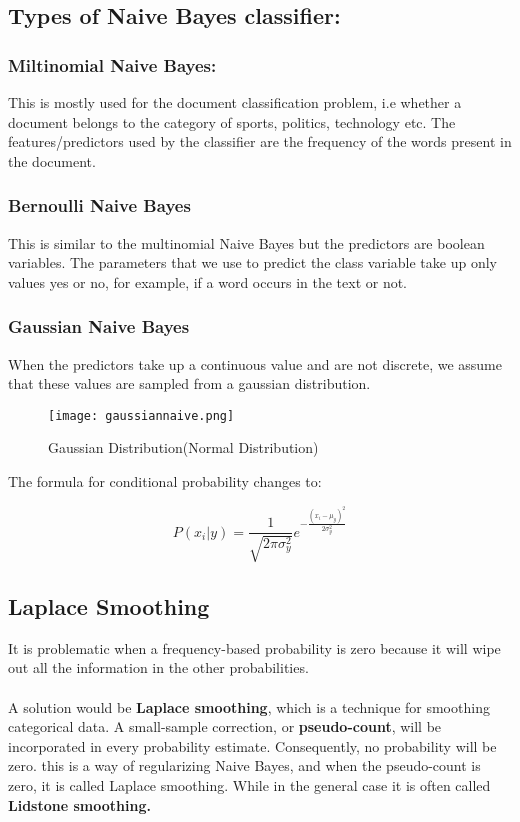 \subsection*{Types of Naive Bayes classifier:}
    \subsubsection*{Miltinomial Naive Bayes:}
        This is mostly used for the document classification problem, i.e whether a document belongs to the category of sports, politics, technology etc. The features/predictors used by the classifier are the frequency of the words present in the document.

    \subsubsection*{Bernoulli Naive Bayes}
        This is similar to the multinomial Naive Bayes but the predictors are boolean variables. The parameters that we use to predict the class variable take up only values yes or no, for example, if a word occurs in the text or not.

    \subsubsection*{Gaussian Naive Bayes}
        When the predictors take up a continuous value and are not discrete, we assume that these values are sampled from a gaussian distribution.

        \begin{figure}[h]
            \centering
            \texttt{[image: gaussiannaive.png]}
            \caption{Gaussian Distribution(Normal Distribution)}
        \end{figure}

        The formula for conditional probability changes to:

        \begin{equation}
            P(x_i|y) = \frac{1}{\sqrt{2\pi\sigma_y^2}}e^{-\frac{(x_i-\mu_y)^2}{2\sigma_y^2}}
        \end{equation}

\subsection*{Laplace Smoothing}
    It is problematic when a frequency-based probability is zero because it will wipe out all the information in the other probabilities.\\ \\
    A solution would be \textbf{Laplace smoothing}, which is a technique for smoothing categorical data. A small-sample correction, or \textbf{pseudo-count}, will be incorporated in every probability estimate. Consequently, no probability will be zero. this is a way of regularizing Naive Bayes, and when the pseudo-count is zero, it is called Laplace smoothing. While in the general case it is often called \textbf{Lidstone smoothing.}

